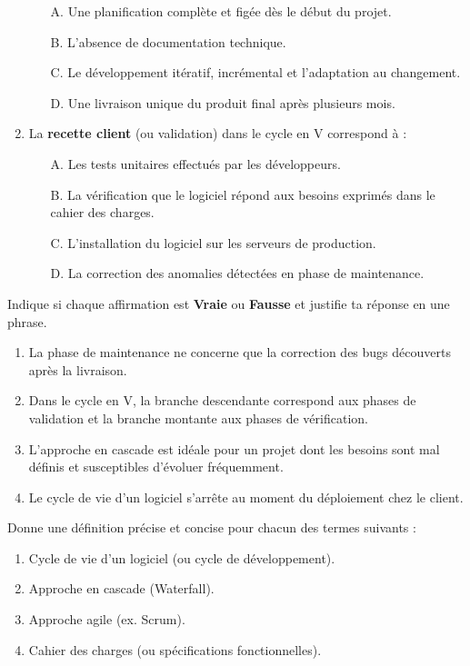 \documentclass[11pt]{article}
\begin{document}
\begin{exercice}
\begin{enumerate}
\begin{itemize}
        \item[A.] Une planification complète et figée dès le début du projet.
        \item[B.] L'absence de documentation technique.
        \item[C.] Le développement itératif, incrémental et l'adaptation au changement.
        \item[D.] Une livraison unique du produit final après plusieurs mois.
    \end{itemize}
    \item La \textbf{recette client} (ou validation) dans le cycle en V correspond à :
    \begin{itemize}
        \item[A.] Les tests unitaires effectués par les développeurs.
        \item[B.] La vérification que le logiciel répond aux besoins exprimés dans le cahier des charges.
        \item[C.] L'installation du logiciel sur les serveurs de production.
        \item[D.] La correction des anomalies détectées en phase de maintenance.
    \end{itemize}
\end{enumerate}
\end{exercice}

\begin{exercice}
Indique si chaque affirmation est \textbf{Vraie} ou \textbf{Fausse} et justifie ta réponse en une phrase.
\begin{enumerate}
    \item La phase de maintenance ne concerne que la correction des bugs découverts après la livraison.
    \item Dans le cycle en V, la branche descendante correspond aux phases de validation et la branche montante aux phases de vérification.
    \item L'approche en cascade est idéale pour un projet dont les besoins sont mal définis et susceptibles d'évoluer fréquemment.
    \item Le cycle de vie d'un logiciel s'arrête au moment du déploiement chez le client.
\end{enumerate}
\end{exercice}

\begin{exercice}
Donne une définition précise et concise pour chacun des termes suivants :
\begin{enumerate}
    \item Cycle de vie d'un logiciel (ou cycle de développement).
    \item Approche en cascade (Waterfall).
    \item Approche agile (ex. Scrum).
    \item Cahier des charges (ou spécifications fonctionnelles).
\end{enumerate}
\end{exercice}
\end{document}
